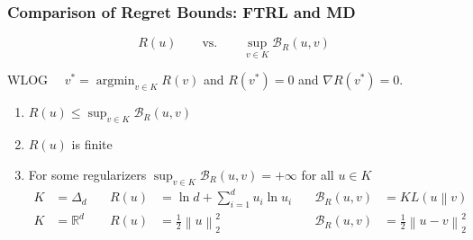 \documentclass[usenames,dvipsnames]{beamer}
\DeclareMathOperator*{\argmin}{argmin}
\newcommand{\R}{\mathbb{R}}
\newcommand{\norm}[1]{\left\|#1\right\|}
\newcommand{\KL}[2]{KL\left({#1}\middle\|{#2}\right)}
\newcommand{\grad}{\nabla}
\newcommand{\Breg}{\mathcal{B}}
\begin{document}
\begin{frame}
\frametitle{Comparison of Regret Bounds: FTRL and MD}

$$
R(u) \qquad \text{vs.} \qquad \sup_{v \in K}\Breg_{R}(u,v)
$$

\vspace{0.5cm}

WLOG \ \ $v^* = \argmin_{v \in K} R(v)$ and $R(v^*) = 0$ and $\grad R(v^*) = 0$.

\vspace{0.5cm}

\everymath{\displaystyle}
\begin{enumerate}
\item $R(u) \le \sup_{v \in K} \Breg_{R}(u,v)$
\item $R(u)$ is finite
\item For some regularizers $\sup_{v \in K} \Breg_{R}(u,v) = + \infty$ for all $u \in K$
\begin{align*}
K & = \Delta_d \quad & R(u) & = \ln d + \sum_{i=1}^d u_i \ln u_i  \quad & \Breg_R(u,v) & = \KL{u}{v} \\
K & = \R^d \quad & R(u) & = \frac{1}{2}\norm{u}_2^2 \quad  & \Breg_R(u,v) & = \frac{1}{2} \norm{u - v}_2^2 \\
\end{align*}

\end{enumerate}
\end{frame}
\end{document}
